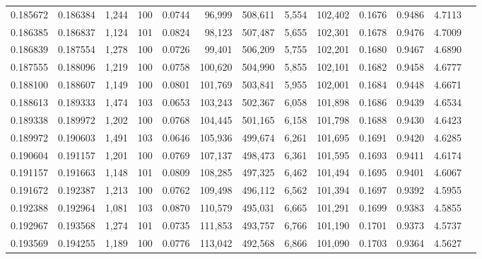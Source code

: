 \begin{tabular}{rrrrrrrrrrrrr}
0.185672 & 0.186384 & 1,244 & 100 &                                     0.0744 &  96,999 & 508,611 &   5,554 & 102,402 & 0.1676 & 0.9486 & 4.7113 \\
0.186385 & 0.186837 & 1,124 & 101 &                                     0.0824 &  98,123 & 507,487 &   5,655 & 102,301 & 0.1678 & 0.9476 & 4.7009 \\
0.186839 & 0.187554 & 1,278 & 100 &                                     0.0726 &  99,401 & 506,209 &   5,755 & 102,201 & 0.1680 & 0.9467 & 4.6890 \\
0.187555 & 0.188096 & 1,219 & 100 &                                     0.0758 & 100,620 & 504,990 &   5,855 & 102,101 & 0.1682 & 0.9458 & 4.6777 \\
0.188100 & 0.188607 & 1,149 & 100 &                                     0.0801 & 101,769 & 503,841 &   5,955 & 102,001 & 0.1684 & 0.9448 & 4.6671 \\
0.188613 & 0.189333 & 1,474 & 103 &                                     0.0653 & 103,243 & 502,367 &   6,058 & 101,898 & 0.1686 & 0.9439 & 4.6534 \\
0.189338 & 0.189972 & 1,202 & 100 &                                     0.0768 & 104,445 & 501,165 &   6,158 & 101,798 & 0.1688 & 0.9430 & 4.6423 \\
0.189972 & 0.190603 & 1,491 & 103 &                                     0.0646 & 105,936 & 499,674 &   6,261 & 101,695 & 0.1691 & 0.9420 & 4.6285 \\
0.190604 & 0.191157 & 1,201 & 100 &                                     0.0769 & 107,137 & 498,473 &   6,361 & 101,595 & 0.1693 & 0.9411 & 4.6174 \\
0.191157 & 0.191663 & 1,148 & 101 &                                     0.0809 & 108,285 & 497,325 &   6,462 & 101,494 & 0.1695 & 0.9401 & 4.6067 \\
0.191672 & 0.192387 & 1,213 & 100 &                                     0.0762 & 109,498 & 496,112 &   6,562 & 101,394 & 0.1697 & 0.9392 & 4.5955 \\
0.192388 & 0.192964 & 1,081 & 103 &                                     0.0870 & 110,579 & 495,031 &   6,665 & 101,291 & 0.1699 & 0.9383 & 4.5855 \\
0.192967 & 0.193568 & 1,274 & 101 &                                     0.0735 & 111,853 & 493,757 &   6,766 & 101,190 & 0.1701 & 0.9373 & 4.5737 \\
0.193569 & 0.194255 & 1,189 & 100 &                                     0.0776 & 113,042 & 492,568 &   6,866 & 101,090 & 0.1703 & 0.9364 & 4.5627 \\

\end{tabular}
